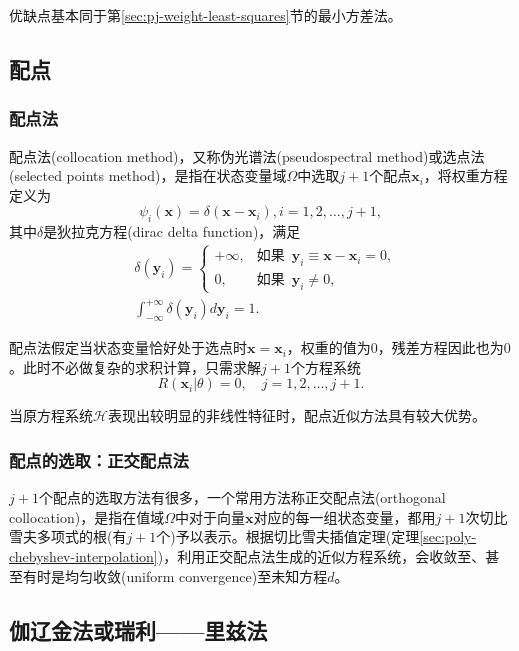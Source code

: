 优缺点基本同于第\ref{sec:pj-weight-least-squares}节的最小方差法。

\subsection{配点}
\label{sec:pj-weight-collocation}
\subsubsection{配点法}
\label{sec:pj-weight-collocation-method}
配点法(collocation method)，又称伪光谱法(pseudospectral method)或选点法(selected points method)，是指在状态变量域$\Omega$中选取$j+1$个配点$\bm{x}_i$，将权重方程定义为
\begin{equation*}
  \psi_i(\bm{x}) = \delta(\bm{x} - \bm{x}_i), i=1,2,\ldots,j+1,
\end{equation*}
其中$\delta$是狄拉克方程(dirac delta function)，满足
\begin{equation*}
  \begin{split}
    &\delta(\bm{y}_i) = \begin{cases}
    +\infty, &\text{如果 }\, \bm{y}_i \equiv \bm{x} - \bm{x}_i =0,\\
     0, &\text{如果 }\, \bm{y}_i \neq 0,
    \end{cases} \\
    &\int_{-\infty}^{+\infty} \delta(\bm{y}_i) d \bm{y}_i
 = 1.
  \end{split}
\end{equation*}

配点法假定当状态变量恰好处于选点时$\bm{x} = \bm{x}_i$，权重的值为$0$，残差方程因此也为$0$。此时不必做复杂的求积计算，只需求解$j+1$个方程系统
\begin{equation*}
  R\left( \bm{x}_i | \theta \right) =0, \quad j=1,2,\ldots,j+1.
\end{equation*}

当原方程系统$\mathcal{H}$表现出较明显的非线性特征时，配点近似方法具有较大优势。

\subsubsection{配点的选取：正交配点法}
\label{sec:pj-weight-collocation-orthogonal}

$j+1$个配点的选取方法有很多，一个常用方法称正交配点法(orthogonal collocation)，是指在值域$\Omega$中对于向量$\bm{x}$对应的每一组状态变量，都用$j+1$次切比雪夫多项式的根(有$j+1$个)予以表示。根据切比雪夫插值定理(定理\ref{sec:poly-chebyshev-interpolation})，利用正交配点法生成的近似方程系统，会收敛至、甚至有时是均匀收敛(uniform convergence)至未知方程$d$。

\subsection{伽辽金法或瑞利——里兹法}
\label{sec:pj-weight-galerkin}
